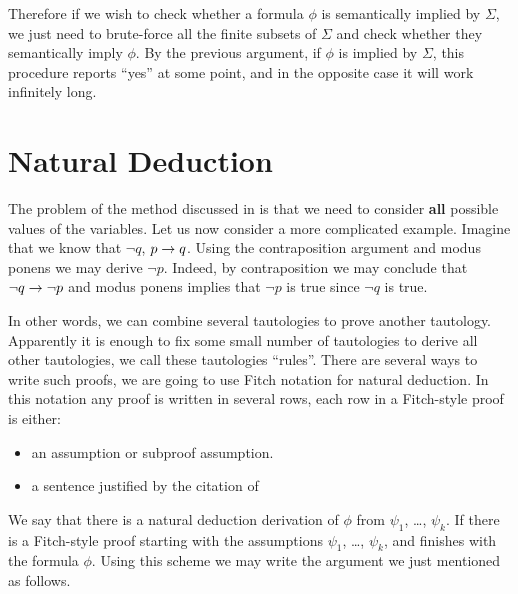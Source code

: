 Therefore if we wish to check whether a formula $\phi$ is semantically implied
by $\Sigma$, we just need to brute-force all the finite subsets of $\Sigma$ and
check whether they semantically imply $\phi$. By the previous argument, if
$\phi$ is implied by $\Sigma$, this procedure reports ``yes'' at some point,
and in the opposite case it will work infinitely long.

\section{Natural Deduction}


The problem of the method discussed in  is that we
need to consider \textbf{all} possible values of the variables. Let us now
consider a more complicated example. Imagine that we know that $\lnot q$,
$p \rightarrow q$. Using the contraposition argument and modus ponens we may derive
$\lnot p$. Indeed, by contraposition we may conclude that
$\lnot q \rightarrow \lnot p$ and modus ponens implies that $\lnot p$ is true since
$\lnot q$ is true.

In other words, we can combine several tautologies to prove another tautology.
Apparently it is enough to fix some small number of tautologies to derive all
other tautologies, we call these tautologies ``rules''. There are several ways
to write such proofs, we are going to use Fitch notation for natural deduction.
In this notation any proof is written in several rows, each row in a Fitch-style
proof is either:
\begin{itemize}
  \item an assumption or subproof assumption.
  \item a sentence justified by the citation of
\end{itemize}
We say that there is a natural deduction derivation of $\phi$ from $\psi_1$,
\dots, $\psi_k$. If there is a Fitch-style proof starting with the assumptions
$\psi_1$, \dots, $\psi_k$, and finishes with the formula $\phi$.
Using this scheme we may write the argument we just mentioned as follows.

